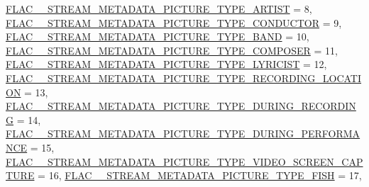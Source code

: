 \begin{DoxyCompactItemize}
\newline
\hyperlink{group__flac__format_ggaf6d3e836cee023e0b8d897f1fdc9825da4cead70f8720f180fc220e6df8d55cce}{F\+L\+A\+C\+\_\+\+\_\+\+S\+T\+R\+E\+A\+M\+\_\+\+M\+E\+T\+A\+D\+A\+T\+A\+\_\+\+P\+I\+C\+T\+U\+R\+E\+\_\+\+T\+Y\+P\+E\+\_\+\+A\+R\+T\+I\+ST} = 8, 
\hyperlink{group__flac__format_ggaf6d3e836cee023e0b8d897f1fdc9825dae01a47af0b0c4d89500b755ebca866ce}{F\+L\+A\+C\+\_\+\+\_\+\+S\+T\+R\+E\+A\+M\+\_\+\+M\+E\+T\+A\+D\+A\+T\+A\+\_\+\+P\+I\+C\+T\+U\+R\+E\+\_\+\+T\+Y\+P\+E\+\_\+\+C\+O\+N\+D\+U\+C\+T\+OR} = 9, 
\hyperlink{group__flac__format_ggaf6d3e836cee023e0b8d897f1fdc9825da8515523b4c9ab65ffef7db98bc09ceb1}{F\+L\+A\+C\+\_\+\+\_\+\+S\+T\+R\+E\+A\+M\+\_\+\+M\+E\+T\+A\+D\+A\+T\+A\+\_\+\+P\+I\+C\+T\+U\+R\+E\+\_\+\+T\+Y\+P\+E\+\_\+\+B\+A\+ND} = 10, 
\hyperlink{group__flac__format_ggaf6d3e836cee023e0b8d897f1fdc9825da5ea1554bc96deb45731bc5897600d1c2}{F\+L\+A\+C\+\_\+\+\_\+\+S\+T\+R\+E\+A\+M\+\_\+\+M\+E\+T\+A\+D\+A\+T\+A\+\_\+\+P\+I\+C\+T\+U\+R\+E\+\_\+\+T\+Y\+P\+E\+\_\+\+C\+O\+M\+P\+O\+S\+ER} = 11, 
\newline
\hyperlink{group__flac__format_ggaf6d3e836cee023e0b8d897f1fdc9825da86159eda8969514f5992b3e341103f22}{F\+L\+A\+C\+\_\+\+\_\+\+S\+T\+R\+E\+A\+M\+\_\+\+M\+E\+T\+A\+D\+A\+T\+A\+\_\+\+P\+I\+C\+T\+U\+R\+E\+\_\+\+T\+Y\+P\+E\+\_\+\+L\+Y\+R\+I\+C\+I\+ST} = 12, 
\hyperlink{group__flac__format_ggaf6d3e836cee023e0b8d897f1fdc9825dac96e810cdd81465709b4a3a03289e89c}{F\+L\+A\+C\+\_\+\+\_\+\+S\+T\+R\+E\+A\+M\+\_\+\+M\+E\+T\+A\+D\+A\+T\+A\+\_\+\+P\+I\+C\+T\+U\+R\+E\+\_\+\+T\+Y\+P\+E\+\_\+\+R\+E\+C\+O\+R\+D\+I\+N\+G\+\_\+\+L\+O\+C\+A\+T\+I\+ON} = 13, 
\hyperlink{group__flac__format_ggaf6d3e836cee023e0b8d897f1fdc9825da8cee3bb376ed1044b3a7e20b9c971ff1}{F\+L\+A\+C\+\_\+\+\_\+\+S\+T\+R\+E\+A\+M\+\_\+\+M\+E\+T\+A\+D\+A\+T\+A\+\_\+\+P\+I\+C\+T\+U\+R\+E\+\_\+\+T\+Y\+P\+E\+\_\+\+D\+U\+R\+I\+N\+G\+\_\+\+R\+E\+C\+O\+R\+D\+I\+NG} = 14, 
\hyperlink{group__flac__format_ggaf6d3e836cee023e0b8d897f1fdc9825da4d4dc6904984370501865988d948de3f}{F\+L\+A\+C\+\_\+\+\_\+\+S\+T\+R\+E\+A\+M\+\_\+\+M\+E\+T\+A\+D\+A\+T\+A\+\_\+\+P\+I\+C\+T\+U\+R\+E\+\_\+\+T\+Y\+P\+E\+\_\+\+D\+U\+R\+I\+N\+G\+\_\+\+P\+E\+R\+F\+O\+R\+M\+A\+N\+CE} = 15, 
\newline
\hyperlink{group__flac__format_ggaf6d3e836cee023e0b8d897f1fdc9825da7adc2b194968b51768721de7bda39df9}{F\+L\+A\+C\+\_\+\+\_\+\+S\+T\+R\+E\+A\+M\+\_\+\+M\+E\+T\+A\+D\+A\+T\+A\+\_\+\+P\+I\+C\+T\+U\+R\+E\+\_\+\+T\+Y\+P\+E\+\_\+\+V\+I\+D\+E\+O\+\_\+\+S\+C\+R\+E\+E\+N\+\_\+\+C\+A\+P\+T\+U\+RE} = 16, 
\hyperlink{group__flac__format_ggaf6d3e836cee023e0b8d897f1fdc9825dabbf0d7c519ae8ba8cec7d1f165f67b0f}{F\+L\+A\+C\+\_\+\+\_\+\+S\+T\+R\+E\+A\+M\+\_\+\+M\+E\+T\+A\+D\+A\+T\+A\+\_\+\+P\+I\+C\+T\+U\+R\+E\+\_\+\+T\+Y\+P\+E\+\_\+\+F\+I\+SH} = 17, 

\end{DoxyCompactItemize}

